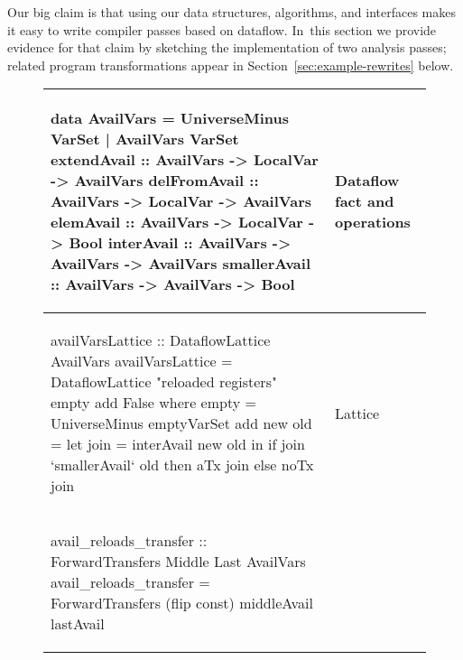 \documentclass[blockstyle,preprint,nocopyrightspace]{sigplanconf}
\newcommand\secref[1]{Section~\ref{sec:#1}}
\begin{document}
Our big claim is that using our data structures, algorithms, and
interfaces makes it easy to write compiler passes based on dataflow.
In~this section we provide evidence for that claim by sketching the
implementation of two analysis passes;
related program transformations appear in \secref{example-rewrites}
below. 

\newcommand\T{\rule{0pt}{0.6ex}}
\newcommand\B{\rule[-0.05ex]{0pt}{0pt}}
\newenvironment{codetable}{\begin{tabular}{CL}}{\end{tabular}}

\begin{figure*}
\begin{codetable}
\T\begin{code}
data AvailVars = UniverseMinus VarSet
               | AvailVars     VarSet
extendAvail  :: AvailVars -> LocalVar  -> AvailVars
delFromAvail :: AvailVars -> LocalVar  -> AvailVars
elemAvail    :: AvailVars -> LocalVar  -> Bool
interAvail   :: AvailVars -> AvailVars -> AvailVars
smallerAvail :: AvailVars -> AvailVars -> Bool
\end{code}\B
& Dataflow fact and operations\\
\hline

\T\begin{code}
availVarsLattice :: DataflowLattice AvailVars
availVarsLattice = DataflowLattice "reloaded registers" empty add False
    where empty = UniverseMinus emptyVarSet
          add new old = let join = interAvail new old in
                        if join `smallerAvail` old then aTx join else noTx join
\end{code}\B
& Lattice\\
\hline

\T\begin{code}
avail_reloads_transfer :: ForwardTransfers Middle Last AvailVars
avail_reloads_transfer = ForwardTransfers (flip const) middleAvail lastAvail


\end{code}
\end{codetable}
\end{figure*}
\end{document}
